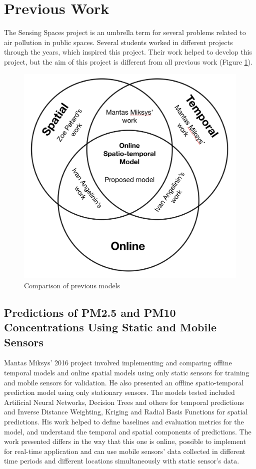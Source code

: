 \section{Previous Work}

The Sensing Spaces project is an umbrella term for several problems related to air pollution in public spaces. Several students worked in different projects through the years, which inspired this project. Their work helped to develop this project, but the aim of this project is different from all previous work (Figure \ref{fig:venn_diagram}).
\begin{figure}[H]
    \centering
    \includegraphics[width=.6\textwidth]{images/venn_diagram.png}
    \caption{Comparison of previous models}
    \label{fig:venn_diagram}
\end{figure}


\subsection {Predictions of PM2.5 and PM10 Concentrations Using Static and Mobile Sensors}

Mantas Miksys' 2016  project \cite{mantas} involved implementing and comparing offline temporal models and online spatial models using only static sensors for training and mobile sensors for validation. He also presented an offline spatio-temporal prediction model using only stationary sensors.  The models tested included Artificial Neural Networks, Decision Trees and others for temporal predictions and Inverse Distance Weighting, Kriging and Radial Basis Functions for spatial predictions. His work helped to define baselines and evaluation metrics for the model, and understand the temporal and spatial components of predictions.
The work presented differs in the way that this one is online, possible to implement for real-time application and can use mobile sensors' data collected in different time periods and different locations simultaneously with static sensor's data.

